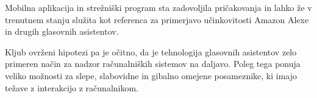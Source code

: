 \documentclass[a4paper, 12pt]{book}
\begin{document}
Mobilna aplikacija in strežniški program sta zadovoljila pričakovanja in lahko že v trenutnem stanju služita kot referenca za primerjavo učinkovitosti Amazon Alexe in drugih glasovnih asistentov.

Kljub ovrženi hipotezi pa je očitno, da je tehnologija glasovnih asistentov zelo primeren način za nadzor računalniških sistemov na daljavo.
Poleg tega ponuja veliko možnosti za slepe, slabovidne in gibalno omejene posameznike, ki imajo težave z interakcijo z računalnikom.




\newpage %
\ \\
\clearpage
{}

\printbibliography
\end{document}
